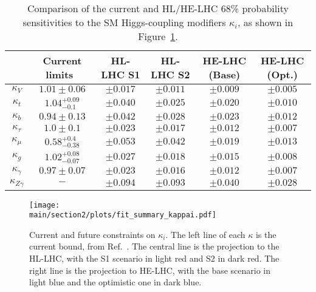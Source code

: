 \begin{table}[ht!]
\begin{center}
\caption{Comparison of the current and HL/HE-LHC 68\% probability sensitivities to the SM Higgs-coupling modifiers $\kappa_{i}$, as shown in Figure~\ref{fig:projection.kappai}.}\label{tab:projection.kappai}
\begin{tabular}{ c c c c c c }
  \hline\hline
  & Current limits~\cite{deBlas:2018tjm}  & HL-LHC S1 & HL-LHC S2 & HE-LHC (Base)&HE-LHC (Opt.) \\
  \hline
   $\kappa_{V}$&$1.01\pm0.06$ &$\pm 0.017$&$\pm 0.011$&$\pm 0.009$&$\pm 0.005$\\
  $\kappa_{t}$&$1.04^{+0.09}_{-0.1}$&$\pm 0.040$&$\pm 0.025$&$\pm 0.020$&$\pm 0.010$\\
  $\kappa_{b}$&$0.94\pm 0.13$ &$\pm 0.042$&$\pm 0.028$&$\pm 0.023$&$\pm 0.012$ \\
  $\kappa_{\tau}$&$1.0\pm 0.1$ &$\pm 0.023$&$\pm 0.017$& $\pm 0.012$&$\pm 0.007$\\
  $\kappa_{\mu}$&$0.58^{+0.4}_{-0.38} $ &$\pm 0.053$&$\pm 0.042$& $\pm 0.019$&$\pm 0.013$\\
  $\kappa_{g}$&$1.02^{+0.08}_{-0.07} $ &$\pm 0.027$&$\pm 0.018$& $\pm 0.015$&$\pm 0.008$\\
  $\kappa_{\gamma}$ &$0.97\pm 0.07 $&$\pm 0.023$&$\pm 0.016$&$\pm 0.012$&$\pm 0.007$\\
  $\kappa_{Z\gamma}$ &$-$&$\pm 0.094$&$\pm 0.093$&$\pm 0.040$&$\pm 0.028$\\
\hline\hline
\end{tabular}
\end{center}
\end{table}
%
\begin{figure}[ht]
\texttt{[image: \\main/section2/plots/fit\_summary\_kappai.pdf]}
\caption{Current and future constraints on $\kappa_{i}$. The left line of each $\kappa$ is the current bound, from Ref.~\cite{deBlas:2018tjm}. The central line is the projection to the HL-LHC, with the S1 scenario in light red and S2 in dark red. The right line is the projection to HE-LHC, with the base scenario in light blue and the optimistic one in dark blue.}\label{fig:projection.kappai}
\end{figure}
